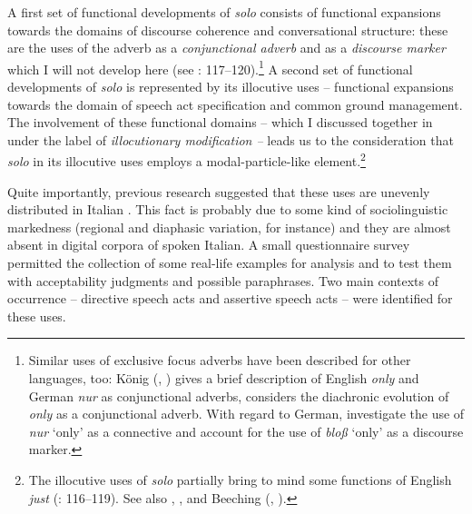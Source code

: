 A first set of functional developments of \textit{solo} consists of functional expansions towards the domains of discourse coherence and conversational structure: these are the uses of the adverb as a \textit{conjunctional adverb} and as a \textit{discourse marker} which I will not develop here (see \citealt{Favaro2020}: 117–120).\footnote{Similar uses of exclusive focus adverbs have been described for other languages, too: König (\citeyear[106--107]{König1991}, \citeyear[34–38]{König2017}) gives a brief description of English \textit{only} and German \textit{nur} as conjunctional adverbs, \citet{Brinton1998b} considers the diachronic evolution of \textit{only} as a conjunctional adverb. With regard to German, \citet[78--81]{ModicomDuplâtre2018} investigate the use of \textit{nur} ‘only’ as a connective and \citet[337–338]{AuerGünthner2005} account for the use of \textit{bloß} ‘only’ as a discourse marker.} A second set of functional developments of \textit{solo} is represented by its illocutive uses – functional expansions towards the domain of speech act specification and common ground management. The involvement of these functional domains – which I discussed together in  under the label of \textit{illocutionary modification –} leads us to the consideration that \textit{solo} in its illocutive uses employs a modal-particle-like element.\footnote{The illocutive uses of \textit{solo} partially bring to mind some functions of English \textit{just} (\citealt{König1991}: 116–119). See also \citet{Lee1987,Lee1991}, \citet[153–174]{Aijmer2002}, \citet{MolinaRomano2012} and Beeching (\citeyear[76–96]{Beeching2016}, \citeyear{Beeching2017}).}

Quite importantly, previous research suggested that these uses are unevenly distributed in Italian \citep{Favaro2019}. This fact is probably due to some kind of sociolinguistic markedness (regional and diaphasic variation, for instance) and they are almost absent in digital corpora of spoken Italian. A small questionnaire survey permitted the collection of some real-life examples for analysis and to test them with acceptability judgments and possible paraphrases. Two main contexts of occurrence – directive speech acts and assertive speech acts – were identified for these uses.

